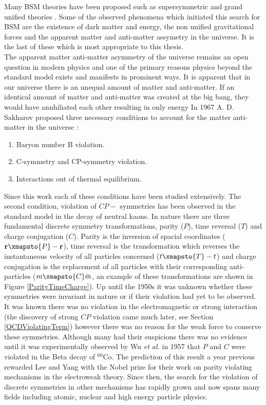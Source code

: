 \documentclass[8pt,a4paper, twoside]{report}
\begin{document}
\linebreak
Many BSM theories have been proposed such as supersymmetric \cite{Fayet1976, Fayet1977}  and grand unified theories \cite{}. Some of the observed phenomena which initiated this search for BSM are the existence of dark matter and energy, the non unified gravitational forces and the apparent matter and anti-matter assymetry in the universe. It is the last of these which is most appropriate to this thesis. \\
\linebreak
The apparent matter anti-matter asymmetry of the universe remains an open question in modern physics and one of the primary reasons physics beyond the standard model exists and manifests in prominent ways.  It is apparent that in our universe there is an unequal amount of matter and anti-matter. If an identical amount of matter and anti-matter was created at the big bang, they would have annhiliated each other resulting in only energy
In 1967 A. D. Sakharov proposed three necessary conditions to account for the matter anti-matter in the universe \cite{Sakharov1967}:
\begin{enumerate}
\item Baryon number B violation.
\item  C-symmetry and CP-symmetry violation.
\item Interactions out of thermal equilibrium.
\end{enumerate}
Since this work each of these conditions have been studied extensively. The second condition, violation of $CP-$ symmetries has been observed in the standard model in the decay of neutral kaons. 
\iffalse
In nature there are three fundamental discrete symmetry transformations, parity ($P$), time reversal ($T$) and charge conjugation ($C$). Parity is the inversion of spacial coordinates ($\textbf{r} \xmapsto{P} -\textbf{r}$), time reversal is the transformation which reverses the instantaneous velocity  of all particles concerned ($t \xmapsto{T} -t$) and charge conjugation is the replacement of all particles with their corresponding anti-particles ($m \xmapsto{C} \bar{m}$, an example of these transformations are shown in Figure \ref{ParityTimeCharge}). Up until the 1950s it was unknown whether these symmetries were invariant in nature or if their violation had yet to be observed. It was known there was no violation in the electromagnetic or strong interaction (the discovery of strong $CP$ violation came much later, see Section \ref{QCDViolatingTerm}) however there was no reason for the weak force to conserve these symmetries. Although many had their suspicions \cite{Purcell1950, Dirac1949} there was no evidence until it was experimentally observed by Wu \textit{et al.} in 1957  \cite{Wu1957} that $P$ and $C$ were violated in the Beta decay of $^{60}$Co. The prediction of this result a year previous rewarded Lee and Yang with the Nobel prize for their work \cite{Lee1956} on parity violating mechanisms in the electroweak theory. Since then, the search for the violation of discrete symmetries in other mechanisms has rapidly grown and now spans many fields including atomic, nuclear and high energy particle physics. \\
\end{document}
